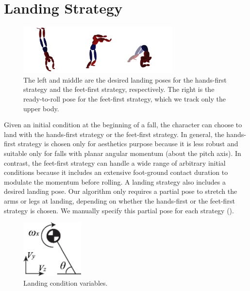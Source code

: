 \section{Landing Strategy}

\begin{figure}[ht]
\center
  \includegraphics[width=3.2in]{images/LandingPoses}
  \caption{
    The left and middle are the desired landing poses for the
    hands-first strategy and the feet-first strategy, respectively.
    The right is the ready-to-roll pose for the feet-first strategy,
    which we track only the upper body.
  }
 \label{fig:landing_landingPoses}
\end{figure}

Given an initial condition at the beginning of a fall, the character
can choose to land with the hands-first strategy or the feet-first
strategy.  In general, the hands-first strategy is chosen only for
aesthetics purpose because it is less robust and suitable only for
falls with planar angular momentum (about the pitch axis). In
contrast, the feet-first strategy can handle a wide range of arbitrary
initial conditions because it includes an extensive foot-ground
contact duration to modulate the momentum before rolling. A
landing strategy also includes a desired landing pose. Our algorithm
only requires a partial pose to stretch the arms or legs at landing,
depending on whether the hands-first or the feet-first strategy is
chosen. We manually specify this partial pose for each strategy
().

\begin{figure}[0.3\textwidth]
  \begin{center}
    \includegraphics[width=0.28\textwidth]{images/COM}
  \end{center}
  \caption{Landing condition variables.}
  \label{fig:landing_com}
\end{figure}

